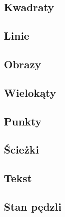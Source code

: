 \subsection{Kwadraty}


\subsection{Linie}


\subsection{Obrazy}


\subsection{Wielokąty}


\subsection{Punkty}


\subsection{Ścieżki}


\subsection{Tekst}


\subsection{Stan pędzli}

